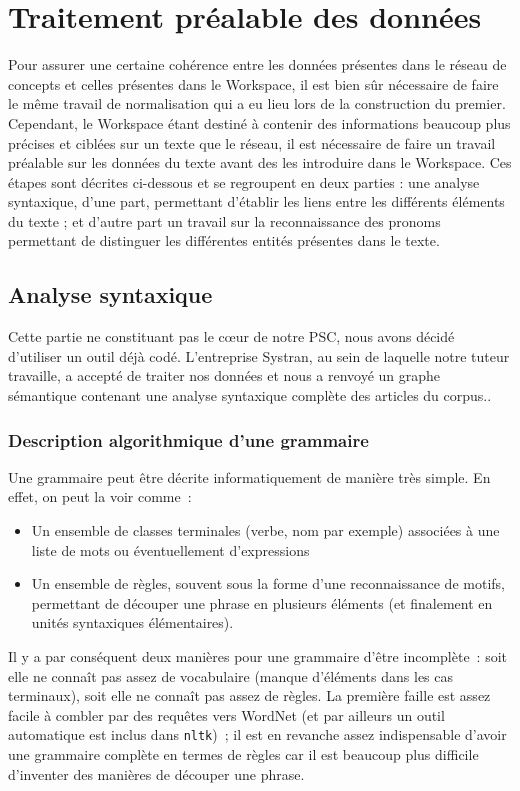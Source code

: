 \documentclass[a4paper, 12pt]{article}
\newcommand{\pyt}[1]{\texttt{#1}}%
\begin{document}
\section{Traitement préalable des données}

Pour assurer une certaine cohérence entre les données présentes dans le réseau de concepts et celles présentes dans le Workspace, il est bien sûr nécessaire de faire le même travail de normalisation qui a eu lieu lors de la construction du premier. Cependant, le Workspace étant destiné à contenir des informations beaucoup plus précises et ciblées sur un texte que le réseau, il est nécessaire de faire un travail préalable sur les données du texte avant des les introduire dans le Workspace. Ces étapes sont décrites ci-dessous et se regroupent en deux parties : une analyse syntaxique, d'une part, permettant d'établir les liens entre les différents éléments du texte ; et d'autre part un travail sur la reconnaissance des pronoms permettant de distinguer les différentes entités présentes dans le texte.

\subsection{Analyse syntaxique}

Cette partie ne constituant pas le c\oe{}ur de notre PSC, nous avons décidé d'utiliser un outil déjà codé. L'entreprise Systran, au sein de laquelle notre tuteur travaille, a accepté de traiter nos données et nous a renvoyé un graphe sémantique contenant une analyse syntaxique complète des articles du corpus..

\subsubsection{Description algorithmique d'une grammaire}
Une grammaire peut être décrite informatiquement de manière très simple. En effet, on peut la voir comme~:
\begin{itemize}
	\item Un ensemble de classes terminales (verbe, nom par exemple) associées à une liste de mots ou éventuellement d'expressions
	\item Un ensemble de règles, souvent sous la forme d'une reconnaissance de motifs, permettant de découper une phrase en plusieurs éléments (et finalement en unités syntaxiques élémentaires).
\end{itemize}

Il y a par conséquent deux manières pour une grammaire d'être incomplète~: soit elle ne connaît pas assez de vocabulaire (manque d'éléments dans les cas terminaux), soit elle ne connaît pas assez de règles. La première faille est assez facile à combler par des requêtes vers WordNet (et par ailleurs un outil automatique est inclus dans \pyt{nltk})~; il est en revanche assez indispensable d'avoir une grammaire complète en termes de règles car il est beaucoup plus difficile d'inventer des manières de découper une phrase.
\end{document}

